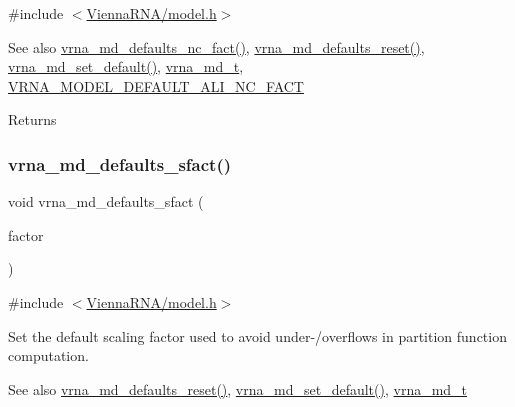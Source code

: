 {\ttfamily \#include $<$\mbox{\hyperlink{model_8h}{Vienna\+R\+N\+A/model.\+h}}$>$}

\begin{DoxySeeAlso}{See also}
\mbox{\hyperlink{group__model__details_gac35e596c850dce3ad55c49119fd7d471}{vrna\+\_\+md\+\_\+defaults\+\_\+nc\+\_\+fact()}}, \mbox{\hyperlink{group__model__details_ga70834424cf804d149937de89f80ceb45}{vrna\+\_\+md\+\_\+defaults\+\_\+reset()}}, \mbox{\hyperlink{group__model__details_ga8ac6ff84936282436f822644bf841f66}{vrna\+\_\+md\+\_\+set\+\_\+default()}}, \mbox{\hyperlink{group__model__details_ga1f8a10e12a0a1915f2a4eff0b28ea17c}{vrna\+\_\+md\+\_\+t}}, \mbox{\hyperlink{group__model__details_ga8f774daaafec28160c1ca5d09f2cbdba}{V\+R\+N\+A\+\_\+\+M\+O\+D\+E\+L\+\_\+\+D\+E\+F\+A\+U\+L\+T\+\_\+\+A\+L\+I\+\_\+\+N\+C\+\_\+\+F\+A\+CT}} 
\end{DoxySeeAlso}
\begin{DoxyReturn}{Returns}

\end{DoxyReturn}
\mbox{\label{group__model__details_ga3f73d3029d3d0025d4cc311510cd95a3}} 
\subsubsection{\texorpdfstring{vrna\+\_\+md\+\_\+defaults\+\_\+sfact()}{vrna\_md\_defaults\_sfact()}}
{\footnotesize\ttfamily void vrna\+\_\+md\+\_\+defaults\+\_\+sfact (\begin{DoxyParamCaption}\item[{double}]{factor }\end{DoxyParamCaption})}



{\ttfamily \#include $<$\mbox{\hyperlink{model_8h}{Vienna\+R\+N\+A/model.\+h}}$>$}



Set the default scaling factor used to avoid under-\//overflows in partition function computation. 

\begin{DoxySeeAlso}{See also}
\mbox{\hyperlink{group__model__details_ga70834424cf804d149937de89f80ceb45}{vrna\+\_\+md\+\_\+defaults\+\_\+reset()}}, \mbox{\hyperlink{group__model__details_ga8ac6ff84936282436f822644bf841f66}{vrna\+\_\+md\+\_\+set\+\_\+default()}}, \mbox{\hyperlink{group__model__details_ga1f8a10e12a0a1915f2a4eff0b28ea17c}{vrna\+\_\+md\+\_\+t}} 
\end{DoxySeeAlso}


